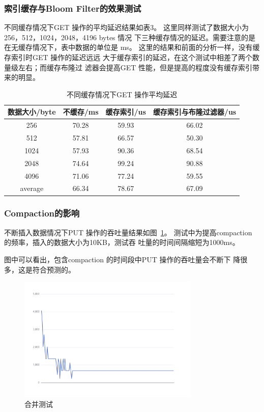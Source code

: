 \documentclass{article}
\begin{document}
\subsubsection{索引缓存与Bloom Filter的效果测试}
不同缓存情况下GET 操作的平均延迟结果如表3。
这里同样测试了数据大小为256，512，1024，2048，4196 bytes 情况
下三种缓存情况的延迟。需要注意的是在无缓存情况下，表中数据的单位是
ms。
这里的结果和前面的分析一样，没有缓存索引时GET 操作的延迟远远
大于缓存索引的延迟，在这个测试中相差了两个数量级左右；而缓存布隆过
滤器会提高GET 性能，但是提高的程度没有缓存索引带来的明显。

\begin{table}[h!]
    \begin{center}
      \caption{不同缓存情况下GET 操作平均延迟}
      \label{figure3}
      \begin{tabular}{c|c|c|c}
        \textbf{数据大小/byte} & \textbf{不缓存/ms} & \textbf{缓存索引/us} & \textbf{缓存索引与布隆过滤器/us}\\
        \hline
        256 & 70.28 & 59.93 & 66.02 \\
        512 & 57.81 & 66.57 & 50.30 \\
        1024 & 57.93 & 90.36 & 68.54 \\
        2048 & 74.64 & 99.24 & 90.88\\
        4096 & 71.06 & 77.24 & 59.55 \\
        \hline
        average & 66.34 & 78.67 & 67.09 \\ 
      \end{tabular}
    \end{center}
\end{table}

\subsubsection{Compaction的影响}
不断插入数据情况下PUT 操作的吞吐量结果如图~\ref{img}。
测试中为提高compaction 的频率，插入的数据大小为10KB，测试吞
吐量的时间间隔缩短为1000ms。\par
图中可以看出，包含compaction 的时间段中PUT 操作的吞吐量会不断下
降很多，这是符合预测的。

\begin{figure}
    \centering
    \includegraphics[width=.8\textwidth, height=6cm]{get_latency.png}
    \caption{合并测试} %
    \label{img} %
\end{figure}
\end{document}
